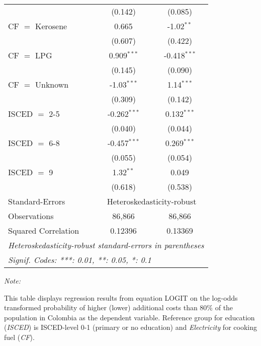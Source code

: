 \begin{table}[htbp!]
\begin{adjustbox}{width = 1\textwidth, max height = 0.95\textheight, center}
\begin{threeparttable}[b]
\begin{tabular}{lcc}
                                 & (0.142)        & (0.085)\\   
            CF $=$ Kerosene      & 0.665          & -1.02$^{**}$\\   
                                 & (0.607)        & (0.422)\\   
            CF $=$ LPG           & 0.909$^{***}$  & -0.418$^{***}$\\   
                                 & (0.145)        & (0.090)\\   
            CF $=$ Unknown       & -1.03$^{***}$  & 1.14$^{***}$\\   
                                 & (0.309)        & (0.142)\\   
            ISCED $=$ 2-5        & -0.262$^{***}$ & 0.132$^{***}$\\   
                                 & (0.040)        & (0.044)\\   
            ISCED $=$ 6-8        & -0.457$^{***}$ & 0.269$^{***}$\\   
                                 & (0.055)        & (0.054)\\   
            ISCED $=$ 9          & 1.32$^{**}$    & 0.049\\   
                                 & (0.618)        & (0.538)\\   
            \midrule 
            Standard-Errors & \multicolumn{2}{c}{Heteroskedasticity-robust} \\ 
            Observations         & 86,866         & 86,866\\  
            Squared Correlation  & 0.12396        & 0.13369\\  
            \midrule \midrule
            \multicolumn{3}{l}{\emph{Heteroskedasticity-robust standard-errors in parentheses}}\\
            \multicolumn{3}{l}{\emph{Signif. Codes: ***: 0.01, **: 0.05, *: 0.1}}\\
         \end{tabular}
         
         \begin{tablenotes}\item \medskip \textit{Note:}
            \item This table displays regression results from equation LOGIT on the log-odds transformed probability of higher (lower) additional costs than 80\% of the population in Colombia as the dependent variable. Reference group for education (\textit{ISCED}) is ISCED-level 0-1 (primary or no education) and \textit{Electricity} for cooking fuel (\textit{CF}).
         \end{tablenotes}
      \end{threeparttable}
   \end{adjustbox}
\end{table}


